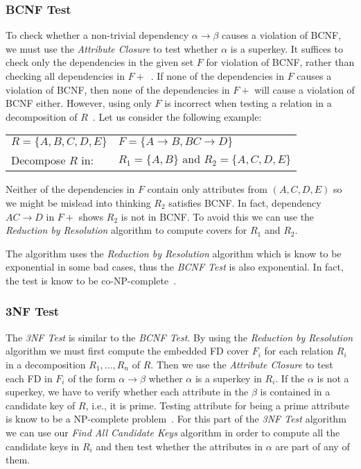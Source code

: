 \subsubsection{BCNF Test}
To check whether a non-trivial dependency $\alpha \rightarrow \beta$  causes a violation of BCNF,
we must use the \textit{Attribute Closure} to test whether $\alpha$ is a superkey. 
It suffices to check only the dependencies in the given set $F$ for violation of BCNF, 
rather than checking all dependencies in $F+$~\cite{bdb4}.  
If none of the dependencies in $F$ causes a violation of BCNF, 
then none of the dependencies in $F+$ will cause a violation of BCNF either.
However, using only $F$ is incorrect when testing a relation in a decomposition of $R$~\cite{bdb4}.
Let us consider the following example:

\begin{center}
\begin{tabular}[h]{l l}
  $R = \{A, B, C, D, E\}$ & $F = \{A \rightarrow B, BC \rightarrow D\}$ \\
  Decompose $R$ in:  & $R_1 = \{A, B\} \mbox{ and } R_2 = \{A, C, D, E\}$ \\ 
\end{tabular}
\end{center}

Neither of the dependencies in $F$ contain only attributes from
$(A,C,D,E)$ so we might be mislead into thinking $R_2$ satisfies BCNF. In fact, 
dependency $AC \rightarrow D$ in $F+$ shows $R_2$ is not in BCNF. To avoid this we can
use the \textit{Reduction by Resolution} algorithm to compute covers for $R_1$ and $R_2$. 

The algorithm uses the \textit{Reduction by Resolution} algorithm which is know to be exponential
in some bad cases, thus the \textit{BCNF Test} is also exponential. In fact, the test is know to 
be co-NP-complete~\cite{p4}.

\subsubsection{3NF Test}
The \textit{3NF Test} is similar to the \textit{BCNF Test}. By using the \textit{Reduction by Resolution} algorithm
we must first compute the
embedded FD cover $F_i$ for each relation $R_i$ in a decomposition $R_1,...,R_n$ of $R$. Then we use 
the \textit{Attribute Closure} to test each FD in $F_i$ of the form $\alpha \rightarrow \beta$ 
whether $\alpha$ is a superkey in $R_i$. 
If the $\alpha$ is not a superkey, we have to verify whether each attribute in the $\beta$ 
is contained in a candidate key of $R$, i.e., it is prime. Testing attribute for being a prime
attribute is know to be a NP-complete problem~\cite{p3}. For this part of the \textit{3NF Test} algorithm
we can use our \textit{Find All Candidate Keys} algorithm in order
to compute all the candidate keys in $R_i$ and then test whether the attributes in $\alpha$ are part of any 
of them.

